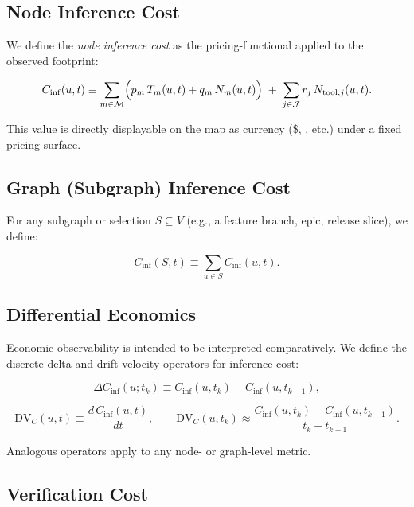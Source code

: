 \documentclass{aastex701}
\providecommand{\euro}{\texteuro}
\begin{document}
\subsection{Node Inference Cost}

We define the \emph{node inference cost} as the pricing-functional applied to
the observed footprint:

\begin{equation}
C_{\mathrm{inf}}(u,t) \equiv
\sum_{m \in \mathcal{M}}
\Bigl(p_m\,T_m(u,t) + q_m\,N_m(u,t)\Bigr)
\;+\;
\sum_{j \in \mathcal{J}} r_j\,N_{\mathrm{tool},j}(u,t).
\end{equation}

This value is directly displayable on the map as currency (\$, \euro, etc.)
under a fixed pricing surface.

\subsection{Graph (Subgraph) Inference Cost}

For any subgraph or selection $S \subseteq V$ (e.g., a feature branch, epic,
release slice), we define:

\begin{equation}
C_{\mathrm{inf}}(S,t) \equiv \sum_{u \in S} C_{\mathrm{inf}}(u,t).
\end{equation}

\subsection{Differential Economics}

Economic observability is intended to be interpreted comparatively. We define
the discrete delta and drift-velocity operators for inference cost:

\begin{equation}
\Delta C_{\mathrm{inf}}(u; t_k) \equiv
C_{\mathrm{inf}}(u,t_k) - C_{\mathrm{inf}}(u,t_{k-1}),
\end{equation}

\begin{equation}
\mathrm{DV}_{C}(u,t) \equiv \frac{d\,C_{\mathrm{inf}}(u,t)}{dt},
\qquad
\mathrm{DV}_{C}(u,t_k) \approx \frac{C_{\mathrm{inf}}(u,t_k)-C_{\mathrm{inf}}(u,t_{k-1})}{t_k-t_{k-1}}.
\end{equation}

Analogous operators apply to any node- or graph-level metric.

\subsection{Verification Cost}
\end{document}
